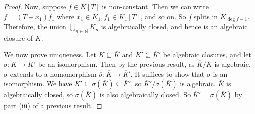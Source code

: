 \begin{proof}
	Now, suppose \( f \in K[T] \) is non-constant.
	Then we can write \( f = (T-x_1)f_1 \) where \( x_1 \in K_1, f_1 \in K_1[T] \), and so on.
	So \( f \) splits in \( K_{\deg f - 1} \).
	Therefore, the union \( \bigcup_{n \in \mathbb N} K_n \) is algebraically closed, and hence is an algebraic closure of \( K \).

	We now prove uniqueness.
	Let \( K \subseteq \overline K \) and \( K' \subseteq \overline K' \) be algebraic closures, and let \( \sigma \colon K \to K' \) be an isomorphism.
	Then by the previous result, as \( \overline K / K \) is algebraic, \( \sigma \) extends to a homomorphism \( \overline \sigma \colon \overline K \to \overline K' \).
	It suffices to show that \( \sigma \) is an isomorphism.
	We have \( K' \subseteq \sigma(\overline K) \subseteq \overline K' \), so \( \overline K' / \sigma(\overline K) \) is algebraic.
	\( \overline K \) is algebraically closed, so \( \sigma(\overline K) \) is also algebraically closed.
	So \( \overline K' = \sigma(\overline K) \) by part (iii) of a previous result.
\end{proof}
